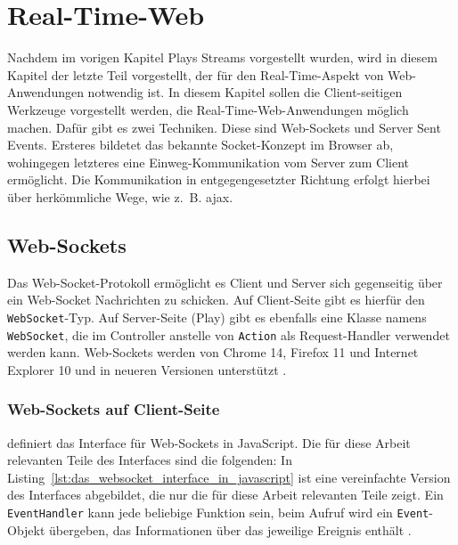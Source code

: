 
\chapter{Real-Time-Web} %
\label{cha:real_time_web}

Nachdem im vorigen Kapitel Plays Streams vorgestellt wurden, wird in diesem Kapitel der letzte Teil vorgestellt, der für den Real-Time-Aspekt von Web-Anwendungen notwendig ist.
In diesem Kapitel sollen die Client-seitigen Werkzeuge vorgestellt werden, die Real-Time-Web-Anwendungen möglich machen.
Dafür gibt es zwei Techniken.
Diese sind Web-Sockets und Server Sent Events.
Ersteres bildetet das bekannte Socket-Konzept im Browser ab, wohingegen letzteres eine Einweg-Kommunikation vom Server zum Client ermöglicht.
Die Kommunikation in entgegengesetzter Richtung erfolgt hierbei über herkömmliche Wege, wie z.~B. \gls{ajax}.

\section{Web-Sockets} %
\label{sec:web_sockets}

Das Web-Socket-Protokoll \cite{websocket_protocol} ermöglicht es Client und Server sich gegenseitig über ein Web-Socket Nachrichten zu schicken.
Auf Client-Seite gibt es hierfür den \lstinline|WebSocket|-Typ.
Auf Server-Seite (Play) gibt es ebenfalls eine Klasse namens \lstinline|WebSocket|, die im Controller anstelle von \lstinline|Action| als Request-Handler verwendet werden kann.
Web-Sockets werden von Chrome 14, Firefox 11 und Internet Explorer 10 und in neueren Versionen unterstützt \cite[vgl.][]{js_websocket_compatibility}.

\subsection{Web-Sockets auf Client-Seite} %
\label{sub:web_sockets_auf_client_seite}

\citealt{js_websockets} definiert das Interface für Web-Sockets in JavaScript.
Die für diese Arbeit relevanten Teile des Interfaces sind die folgenden:
In Listing~\ref{lst:das_websocket_interface_in_javascript} ist eine vereinfachte Version des Interfaces abgebildet, die nur die für diese Arbeit relevanten Teile zeigt.
Ein \lstinline|EventHandler| kann jede beliebige Funktion sein, beim Aufruf wird ein \lstinline|Event|-Objekt übergeben, das Informationen über das jeweilige Ereignis enthält \cite[vgl.][]{js_eventhandler}.

